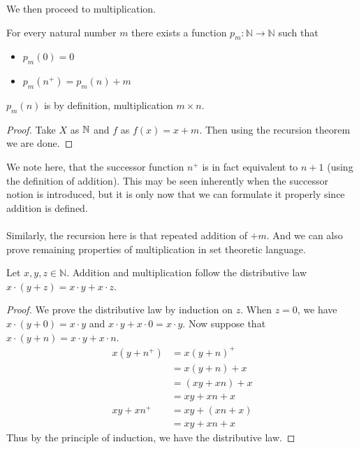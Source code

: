 \documentclass[a4paper]{article}
\begin{document}
We then proceed to multiplication. 

\begin{prp}{}{} For every natural number $m$ there exists a function $p_m:\mathbb{N}\to\mathbb{N}$ such that 
\begin{itemize}
\item $p_m(0)=0$
\item $p_m(n^+)=p_m(n)+m$
\end{itemize}
$p_m(n)$ is by definition, multiplication $m\times n$. \tcbline
\begin{proof}
Take $X$ as $\mathbb{N}$ and $f$ as $f(x)=x+m$. Then using the recursion theorem we are done. 
\end{proof}
\end{prp}

We note here, that the successor function $n^+$ is in fact equivalent to $n+1$ (using the definition of addition). This may be seen inherently when the successor notion is introduced, but it is only now that we can formulate it properly since addition is defined. \\~\\
Similarly, the recursion here is that repeated addition of $+m$. And we can also prove remaining properties of multiplication in set theoretic language. 

\begin{prp}{}{} Let $x,y,z\in\mathbb{N}$. Addition and multiplication follow the distributive law $x\cdot(y+z)=x\cdot y+x\cdot z$. \tcbline
\begin{proof} We prove the distributive law by induction on $z$. When $z=0$, we have $x\cdot(y+0)=x\cdot y$ and $x\cdot y+x\cdot 0=x\cdot y$. Now suppose that $x\cdot(y+n)=x\cdot y+x\cdot n$. 
\begin{align*}
x(y+n^+)&=x(y+n)^+ \tag{Definition of Addition}\\
&=x(y+n)+x \tag{Definition of Multiplication}\\
&=(xy+xn)+x \tag{Induction Hypothesis}\\
&=xy+xn+x \tag{Associativity of Addition}\\
xy+xn^+&=xy+(xn+x) \tag{Definition of Multiplication}\\
&=xy+xn+x \tag{Associativity of Addition}
\end{align*}
Thus by the principle of induction, we have the distributive law. 
\end{proof}
\end{prp}
\end{document}
